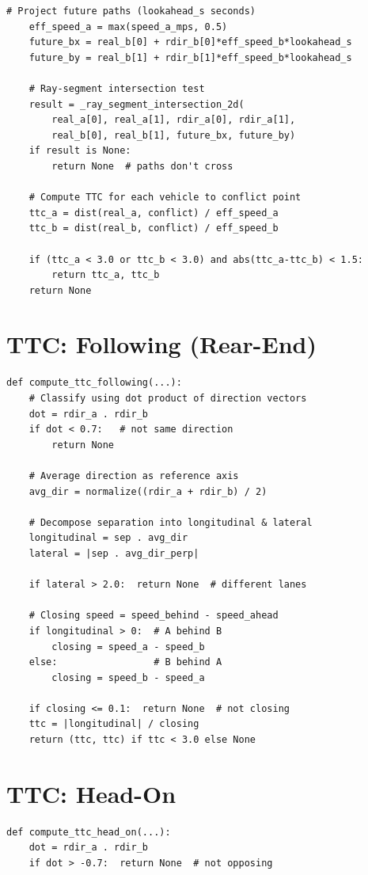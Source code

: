 \documentclass[12pt]{report}
\begin{document}
\begin{appendices}
\begin{lstlisting}[caption={TTC via ray--segment intersection in world space},label={lst:ttc_intersection}]
    # Project future paths (lookahead_s seconds)
    eff_speed_a = max(speed_a_mps, 0.5)
    future_bx = real_b[0] + rdir_b[0]*eff_speed_b*lookahead_s
    future_by = real_b[1] + rdir_b[1]*eff_speed_b*lookahead_s

    # Ray-segment intersection test
    result = _ray_segment_intersection_2d(
        real_a[0], real_a[1], rdir_a[0], rdir_a[1],
        real_b[0], real_b[1], future_bx, future_by)
    if result is None:
        return None  # paths don't cross

    # Compute TTC for each vehicle to conflict point
    ttc_a = dist(real_a, conflict) / eff_speed_a
    ttc_b = dist(real_b, conflict) / eff_speed_b

    if (ttc_a < 3.0 or ttc_b < 3.0) and abs(ttc_a-ttc_b) < 1.5:
        return ttc_a, ttc_b
    return None
\end{lstlisting}

\section{TTC: Following (Rear-End)}
\begin{lstlisting}[caption={TTC for following/rear-end scenario},label={lst:ttc_following}]
def compute_ttc_following(...):
    # Classify using dot product of direction vectors
    dot = rdir_a . rdir_b
    if dot < 0.7:   # not same direction
        return None

    # Average direction as reference axis
    avg_dir = normalize((rdir_a + rdir_b) / 2)

    # Decompose separation into longitudinal & lateral
    longitudinal = sep . avg_dir
    lateral = |sep . avg_dir_perp|

    if lateral > 2.0:  return None  # different lanes

    # Closing speed = speed_behind - speed_ahead
    if longitudinal > 0:  # A behind B
        closing = speed_a - speed_b
    else:                 # B behind A
        closing = speed_b - speed_a

    if closing <= 0.1:  return None  # not closing
    ttc = |longitudinal| / closing
    return (ttc, ttc) if ttc < 3.0 else None
\end{lstlisting}

\section{TTC: Head-On}
\begin{lstlisting}[caption={TTC for head-on scenario},label={lst:ttc_headon}]
def compute_ttc_head_on(...):
    dot = rdir_a . rdir_b
    if dot > -0.7:  return None  # not opposing


\end{lstlisting}
\end{appendices}
\end{document}
